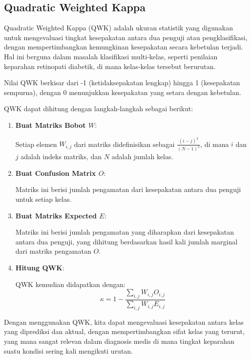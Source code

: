 \subsection{Quadratic Weighted Kappa}

Quadratic Weighted Kappa (QWK) adalah ukuran statistik yang digunakan untuk mengevaluasi tingkat kesepakatan antara dua penguji atau pengklasifikasi, dengan mempertimbangkan kemungkinan kesepakatan secara kebetulan terjadi. Hal ini berguna dalam masalah klasifikasi multi-kelas, seperti penilaian keparahan retinopati diabetik, di mana kelas-kelas tersebut berurutan.

Nilai QWK berkisar dari -1 (ketidaksepakatan lengkap) hingga 1 (kesepakatan sempurna), dengan 0 menunjukkan kesepakatan yang setara dengan kebetulan.

QWK dapat dihitung dengan langkah-langkah sebagai berikut:

\begin{enumerate}
    \item \textbf{Buat Matriks Bobot \(W\)}:
    
    Setiap elemen \(W_{i,j}\) dari matriks didefinisikan sebagai \(\frac{(i - j)^2}{(N - 1)^2}\), di mana \(i\) dan \(j\) adalah indeks matriks, dan \(N\) adalah jumlah kelas.
    
    \item \textbf{Buat Confusion Matrix \(O\)}:
    
    Matriks ini berisi jumlah pengamatan dari kesepakatan antara dua penguji untuk setiap kelas.
    
    \item \textbf{Buat Matriks Expected \(E\)}:
     
    Matriks ini berisi jumlah pengamatan yang diharapkan dari kesepakatan antara dua penguji, yang dihitung berdasarkan hasil kali jumlah marginal dari matriks pengamatan \(O\).
    
    \item \textbf{Hitung QWK}:
    
    QWK kemudian didapatkan dengan:
    \[
    \kappa = 1 - \frac{\sum_{i,j} W_{i,j} O_{i,j}}{\sum_{i,j} W_{i,j} E_{i,j}}
    \]
\end{enumerate}

Dengan menggunakan QWK, kita dapat mengevaluasi kesepakatan antara kelas yang diprediksi dan aktual, dengan mempertimbangkan sifat kelas yang terurut, yang mana sangat relevan dalam diagnosis medis di mana tingkat keparahan suatu kondisi sering kali mengikuti urutan.


